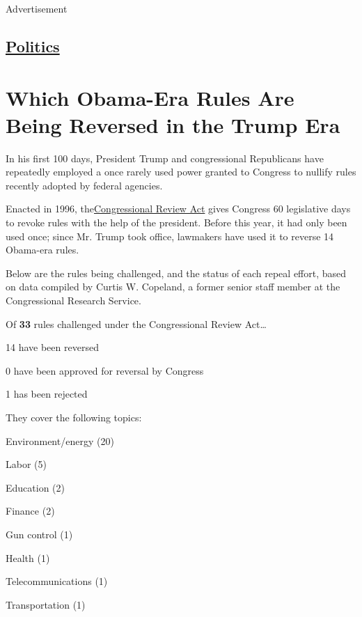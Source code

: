 Advertisement

\hypertarget{-politics-}{%
\subsection{\texorpdfstring{ \href{/section/politics}{Politics}
}{ Politics }}\label{-politics-}}

\hypertarget{which-obama-era-rules-are-being-reversed-in-the-trump-era}{%
\section{Which Obama-Era Rules Are Being Reversed in the Trump
Era}\label{which-obama-era-rules-are-being-reversed-in-the-trump-era}}

In his first 100 days, President Trump and congressional Republicans
have repeatedly employed a once rarely used power granted to Congress to
nullify rules recently adopted by federal agencies.

Enacted in 1996,
the\href{https://www.nytimes3xbfgragh.onion/2017/01/30/us/politics/congressional-review-act-obama-regulations.html}{}\href{https://www.nytimes3xbfgragh.onion/2017/01/30/us/politics/congressional-review-act-obama-regulations.html}{Congressional
Review Act} gives Congress 60 ​legislative ​days to ​revoke rules with
the help of the president. ​Before this year, it had only been used
once; since Mr. Trump took office, lawmakers have used it to reverse 14
Obama-era rules.

Below are the rules being challenged, and the status of each repeal
effort, based on data compiled by Curtis W. Copeland, a former senior
staff member at the Congressional Research Service.

Of \textbf{33} rules challenged under the Congressional Review
Act\ldots{}

14 have been reversed

0 have been approved for reversal by Congress

1 has been rejected

They cover the following topics:

Environment/energy (20)

Labor (5)

Education (2)

Finance (2)

Gun control (1)

Health (1)

Telecommunications (1)

Transportation (1)


